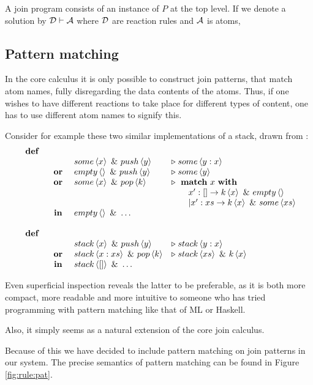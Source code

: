 A join program consists of an instance of $P$ at the top level. If we denote a
solution by $\mathcal{D} \vdash \mathcal{A}$ where $\mathcal{D}$ are reaction rules and $\mathcal{A}$ is atoms,

\subsection{Pattern matching}
In the core calculus it is only possible to construct join patterns, that match
atom names, fully disregarding the data contents of the atoms. Thus, if one wishes
to have different reactions to take place for different types of content, one
has to use different atom names to signify this.

Consider for example these two similar implementations of a stack, drawn from \cite{MaMa2008AlgPat} :
\begin{displaymath}
\begin{array}{rcll}
\defJ
\\ & &  \atm some<x> \andJ \atm push<y>&\toJ{} \atm some<y:x>
\\ &\orJ&\atm empty<> \andJ \atm push<y> &\toJ{} \atm some<y>
\\ &\orJ&\atm some<x> \andJ \atm pop<k> &\toJ{}  \match x \with
\\ &&& \qquad         x':[] \to \atm k<x> \andJ \atm empty<>
\\ &&& \qquad    | x':xs \to \atm k<x> \andJ \atm some<xs>
\\&\inJ& \atm empty<> \andJ \ldots
\\
\\\defJ &&&
\\ & &   \atm stack<x> \andJ \atm push<y> &\toJ{} \atm stack<y:x>
\\&\orJ&  \atm stack<x:xs> \andJ \atm pop<k>& \toJ{} \atm stack<xs> \andJ \atm k<x>
\\&\inJ& \atm stack<[]> \andJ \ldots
\end{array}
\end{displaymath}

Even superficial inspection reveals the latter to be preferable, as it is both
more compact, more readable and more intuitive to someone who has tried
programming with pattern matching like that of ML or Haskell.

Also, it simply seems as a natural extension of the core join calculus.

Because of this we have decided to include pattern matching on join patterns in our system.
The precise semantics of pattern matching can be found in Figure \ref{fig:rule:pat}.

